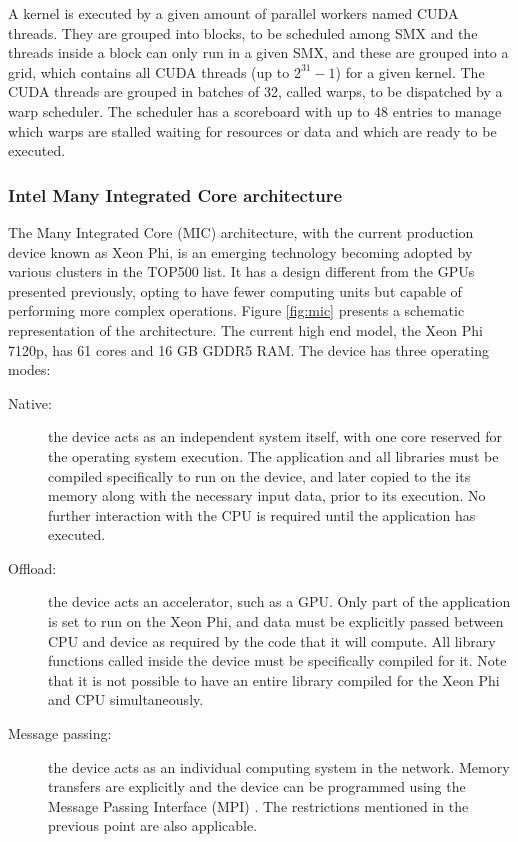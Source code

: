 A kernel is executed by a given amount of parallel workers named CUDA threads. They are grouped into blocks, to be scheduled among SMX and the threads inside a block can only run in a given SMX, and these are grouped into a grid, which contains all CUDA threads (up to $2^{31}-1$) for a given kernel. The CUDA threads are grouped in batches of 32, called warps, to be dispatched by a warp scheduler. The scheduler has a scoreboard with up to 48 entries to manage which warps are stalled waiting for resources or data and which are ready to be executed.

\subsubsection*{Intel Many Integrated Core architecture}
\label{mic}

The \intel Many Integrated Core (MIC) architecture, with the current production device known as \intel Xeon Phi, is an emerging technology becoming adopted by various clusters in the TOP500 list. It has a design different from the \nvidia GPUs presented previously, opting to have fewer computing units but capable of performing more complex operations. Figure \ref{fig:mic} presents a schematic representation of the architecture. The current high end model, the \intel Xeon Phi 7120p, has 61 cores and 16 GB GDDR5 RAM. The device has three operating modes:

\begin{description}
	\item[Native:] the device acts as an independent system itself, with one core reserved for the operating system execution. The application and all libraries must be compiled specifically to run on the device, and later copied to the its memory along with the necessary input data, prior to its execution. No further interaction with the CPU is required until the application has executed.
	\item[Offload:] the device acts an accelerator, such as a GPU. Only part of the application is set to run on the Xeon Phi, and data must be explicitly passed between CPU and device as required by the code that it will compute. All library functions called inside the device must be specifically compiled for it. Note that it is not possible to have an entire library compiled for the Xeon Phi and CPU simultaneously.
	\item[Message passing:] the device acts as an individual computing system in the network. Memory transfers are explicitly and the device can be programmed using the Message Passing Interface (MPI) \cite{MPI}. The restrictions mentioned in the previous point are also applicable.
\end{description}

